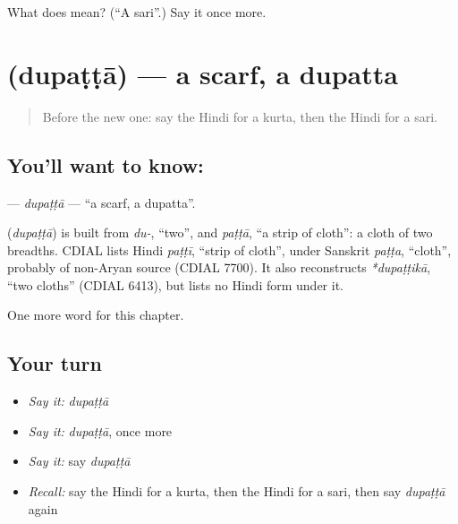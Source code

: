 \begin{tcolorbox}[breakable,colback=teal!4,colframe=teal!35!black,title={Before you move on}]
What does  mean? (\textquotedblleft{}A sari\textquotedblright{}.) Say it once more.
\end{tcolorbox}
\section[\texorpdfstring{\hi{दुपट्टा} (dupaṭṭā)}{दुपट्टा (dupaṭṭā)}]{ (dupaṭṭā) — a scarf, a dupatta}

\label{lesson:HI-C136-dupatta}



\begin{quote}
Before the new one: say the Hindi for a kurta, then the Hindi for a sari.
\end{quote}

\subsection*{You'll want to know: }
\textbf{} — \emph{dupaṭṭā} — \textquotedblleft{}a scarf, a dupatta\textquotedblright{}.

\begin{cousinweb}
\textbf{} (\emph{dupaṭṭā}) is built from \emph{du-}, \textquotedblleft{}two\textquotedblright{}, and \emph{paṭṭā}, \textquotedblleft{}a strip of cloth\textquotedblright{}: a cloth of two breadths. CDIAL lists Hindi \emph{paṭṭī}, \textquotedblleft{}strip of cloth\textquotedblright{}, under Sanskrit \emph{paṭṭa}, \textquotedblleft{}cloth\textquotedblright{}, probably of non-Aryan source (CDIAL 7700). It also reconstructs \emph{*dupaṭṭikā}, \textquotedblleft{}two cloths\textquotedblright{} (CDIAL 6413), but lists no Hindi form under it.
\end{cousinweb}

\begin{grammarlens}[title={What you've built}]
One more word for this chapter.
\end{grammarlens}

\subsection*{Your turn}
\begin{itemize}
\raggedright
  \item \emph{Say it:} \emph{dupaṭṭā}
  \item \emph{Say it:} \emph{dupaṭṭā}, once more
  \item \emph{Say it:} say \emph{dupaṭṭā}
  \item \emph{Recall:} say the Hindi for a kurta, then the Hindi for a sari, then say \emph{dupaṭṭā} again
\end{itemize}

